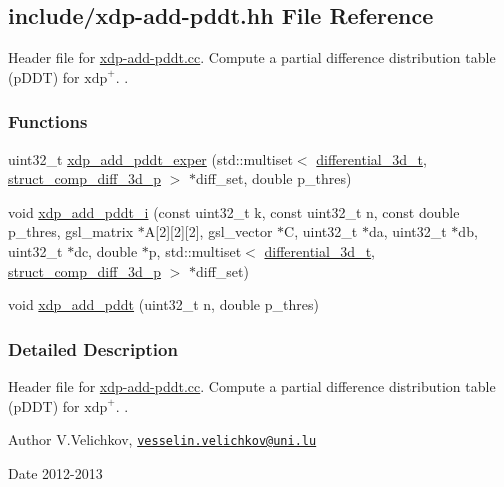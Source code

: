 \hypertarget{xdp-add-pddt_8hh}{\subsection{include/xdp-\/add-\/pddt.hh \-File \-Reference}
\label{xdp-add-pddt_8hh}
}


\-Header file for \hyperlink{xdp-add-pddt_8cc}{xdp-\/add-\/pddt.\-cc}. \-Compute a partial difference distribution table (p\-D\-D\-T) for $\mathrm{xdp}^{+}$. .  


\subsubsection*{\-Functions}
\begin{DoxyCompactItemize}
\item 
uint32\-\_\-t \hyperlink{xdp-add-pddt_8hh_a04cd5582472cde3ab474d6c3d1de11a4}{xdp\-\_\-add\-\_\-pddt\-\_\-exper} (std\-::multiset$<$ \hyperlink{structdifferential__3d__t}{differential\-\_\-3d\-\_\-t}, \hyperlink{structstruct__comp__diff__3d__p}{struct\-\_\-comp\-\_\-diff\-\_\-3d\-\_\-p} $>$ $\ast$diff\-\_\-set, double p\-\_\-thres)
\item 
void \hyperlink{xdp-add-pddt_8hh_a9a024b72abb61a8fca140574fa1027e2}{xdp\-\_\-add\-\_\-pddt\-\_\-i} (const uint32\-\_\-t k, const uint32\-\_\-t n, const double p\-\_\-thres, gsl\-\_\-matrix $\ast$\-A\mbox{[}2\mbox{]}\mbox{[}2\mbox{]}\mbox{[}2\mbox{]}, gsl\-\_\-vector $\ast$\-C, uint32\-\_\-t $\ast$da, uint32\-\_\-t $\ast$db, uint32\-\_\-t $\ast$dc, double $\ast$p, std\-::multiset$<$ \hyperlink{structdifferential__3d__t}{differential\-\_\-3d\-\_\-t}, \hyperlink{structstruct__comp__diff__3d__p}{struct\-\_\-comp\-\_\-diff\-\_\-3d\-\_\-p} $>$ $\ast$diff\-\_\-set)
\item 
void \hyperlink{xdp-add-pddt_8hh_aa503d442ec118773fc9d2a653c8a1915}{xdp\-\_\-add\-\_\-pddt} (uint32\-\_\-t n, double p\-\_\-thres)
\end{DoxyCompactItemize}


\subsubsection{\-Detailed \-Description}
\-Header file for \hyperlink{xdp-add-pddt_8cc}{xdp-\/add-\/pddt.\-cc}. \-Compute a partial difference distribution table (p\-D\-D\-T) for $\mathrm{xdp}^{+}$. . \begin{DoxyAuthor}{\-Author}
\-V.\-Velichkov, \href{mailto:vesselin.velichkov@uni.lu}{\tt vesselin.\-velichkov@uni.\-lu} 
\end{DoxyAuthor}
\begin{DoxyDate}{\-Date}
2012-\/2013 
\end{DoxyDate}


